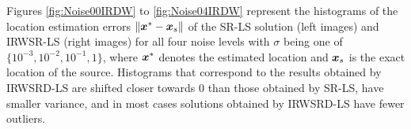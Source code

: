 Figures \ref{fig:Noise00IRDW} to \ref{fig:Noise04IRDW} represent the histograms of the location estimation errors $\|\mbox{\boldmath$x$}^* - \mbox{\boldmath$x$}_s\|$ of the SR-LS solution (left images) and IRWSR-LS (right images) for all four noise levels with $\sigma$ being one of $\{10^{-3}, 10^{-2}, 10^{-1}, 1\}$, where $\mbox{\boldmath$x$}^*$ denotes the estimated location and $\mbox{\boldmath$x$}_s$ is the exact location of the source. Histograms that correspond to the results obtained by IRWSRD-LS are shifted closer towards $0$ than those obtained by SR-LS, have smaller variance, and in most cases solutions obtained by IRWSRD-LS have fewer outliers.





